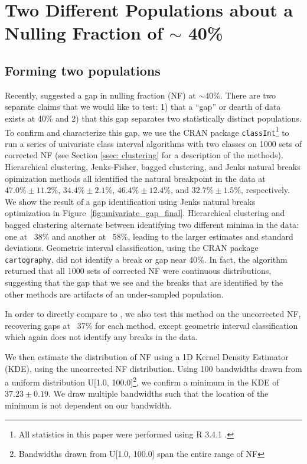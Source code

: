 \documentclass[fleqn,usenatbib]{mnras}
\begin{document}
\section{Two Different Populations about a Nulling Fraction of $\sim$ 40\%}
\label{sec: populations}

\subsection{Forming two populations}

Recently, \citet{Konar2019} suggested a gap in nulling fraction (NF) at $\sim40$\%. There are two separate claims that we would like to test: 1) that a ``gap'' or dearth of data exists at 40\% and 2) that this gap separates two statistically distinct populations. To confirm and characterize this gap, we use the CRAN package \texttt{classInt}\footnote{All statistics in this paper were performed using R 3.4.1 \citep{R2019}.} \citep{classInt2019} to run a series of univariate class interval algorithms with two classes on 1000 sets of corrected NF (see Section \ref{ssec: clustering} for a description of the methods). Hierarchical clustering, Jenks-Fisher, bagged clustering, and Jenks natural breaks opimization methods all identified the natural breakpoint in the data at $47.0\% \pm 11.2\%$, $34.4\% \pm 2.1\%$, $46.4\% \pm 12.4\%$, and $32.7\% \pm 1.5\%$, respectively. We show the result of a gap identification using Jenks natural breaks optimization in Figure~\ref{fig:univariate_gap_final}. Hierarchical clustering and bagged clustering alternate between identifying two different minima in the data: one at ~38\% and another at ~58\%, leading to the larger estimates and standard deviations. Geometric interval classification, using the CRAN package \texttt{cartography}, did not identify a break or gap near 40\%. In fact, the algorithm returned that all 1000 sets of corrected NF were continuous distributions, suggesting that the gap that we see and the breaks that are identified by the other methods are artifacts of an under-sampled population.

In order to directly compare to \citet{Konar2019}, we also test this method on the uncorrected NF, recovering gaps at ~37\% for each method, except geometric interval classification which again does not identify any breaks in the data.

We then estimate the distribution of NF using a 1D Kernel Density Estimator (KDE), using the uncorrected NF distribution. Using 100 bandwidths drawn from a uniform distribution U[1.0, 100.0]\footnote{Bandwidths drawn from U[1.0, 100.0] span the entire range of NF}, we confirm a minimum in the KDE of $37.23\pm0.19$. We draw multiple bandwidths such that the location of the minimum is not dependent on our bandwidth.
\end{document}
